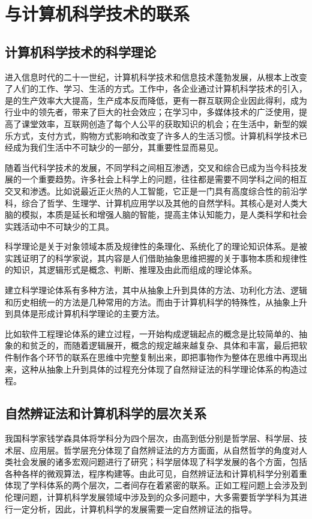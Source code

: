 \documentclass[a4paper,12pt]{report}
\begin{document}
\chapter{与计算机科学技术的联系}
	\begin{spacing}{1.5}
	\songti{}
	
	\section{计算机科学技术的科学理论}
	进入信息时代的二十一世纪，计算机科学技术和信息技术蓬勃发展，从根本上改变了人们的工作、学习、生活的方式。工作中，各企业通过计算机科学技术的引入，是的生产效率大大提高，生产成本反而降低，更有一群互联网企业因此得利，成为行业中的领先者，带来了巨大的社会效应；在学习中，多媒体技术的广泛使用，提高了课堂效率，互联网创造了每个人公平的获取知识的机会；在生活中，新型的娱乐方式，支付方式，购物方式影响和改变了许多人的生活习惯。计算机科学技术已经成为我们生活中不可缺少的一部分，其重要性显而易见。
	
	随着当代科学技术的发展，不同学科之间相互渗透，交叉和综合已成为当今科技发展的一个重要趋势。许多社会上科学上的问题，往往都是需要不同学科之间的相互交叉和渗透。比如说最近正火热的人工智能，它正是一门具有高度综合性的前沿学科，综合了哲学、生理学、计算机应用学以及其他的自然学科。其核心是对人类大脑的模拟，本质是延长和增强人脑的智能，提高主体认知能力，是人类科学和社会实践活动中不可缺少的工具\cite{ai}。
	
	科学理论是关于对象领域本质及规律性的条理化、系统化了的理论知识体系。是被实践证明了的科学家说，其内容是人们借助抽象思维把握的关于事物本质和规律性的知识，其逻辑形式是概念、判断、推理及由此而组成的理论体系。
	
	建立科学理论体系有多种方法，其中从抽象上升到具体的方法、功利化方法、逻辑和历史相统一的方法是几种常用的方法。而由于计算机科学的特殊性，从抽象上升到具体是形成计算机科学理论的主要方法。
	
	比如软件工程理论体系的建立过程，一开始构成逻辑起点的概念是比较简单的、抽象的和贫乏的，而随着逻辑展开，概念的规定越来越复杂、具体和丰富，最后把软件制作各个环节的联系在思维中完整复制出来，即把事物作为整体在思维中再现出来，这种从抽象上升到具体的过程充分体现了自然辩证法的科学理论体系的构造过程。
	
	\section{自然辨证法和计算机科学的层次关系}
	我国科学家钱学森具体将学科分为四个层次，由高到低分别是哲学层、科学层、技术层、应用层。哲学层充分体现了自然辨证法的方方面面，从自然哲学的角度对人类社会发展的诸多宏观问题进行了研究；科学层体现了科学发展的各个方面，包括各种各样的微观算法，程序构建等。由此可见，自然辨证法和计算机科学分别着重体现了学科体系的两个层次，二者间存在着紧密的联系。正如工程问题上会涉及到伦理问题，计算机科学发展领域中涉及到的众多问题中，大多需要哲学学科为其进行一定分析，因此，计算机科学的发展需要一定自然辨证法的指导。
	

\end{spacing}
\end{document}
